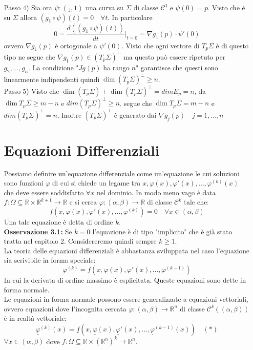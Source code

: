 \documentclass[a4paper,11pt,titlepage]{book}
\begin{document}
Passo 4) Sia ora $\psi:(_1,1)$ una curva su $\Sigma$ di classe $\mathcal{C}^1$ e $\psi(0)=p$. Visto che è su $\Sigma$ allora $(g_1\circ\psi)(t)=0\quad\forall t$. In particolare $$0=\frac{d((g_1\circ\psi)(t))}{dt}|_{t=0}=\nabla g_1(p)\cdot\psi'(0)$$ ovvero $\nabla g_1(p)$ è ortogonale a $\psi ' (0)$. Visto che ogni vettore di $T_p\Sigma$ è di questo tipo ne segue che $\nabla g_1(p)\in (T_p\Sigma)^\perp$ ma questo può essere ripetuto per $g_2,\ldots,g_n$. La condizione "$Jg(p)$ ha rango $n$" garantisce che questi sono linearmente indipendenti quindi $\dim(T_p\Sigma)^\perp\geq n$.\\

Passo 5) Visto che $\dim(T_p\Sigma)+\dim(T_p\Sigma)^\perp=dim E_p=n$, da $\dim T_p\Sigma\geq m-n$ e $dim(T_p\Sigma)^\perp\geq n$, segue che $\dim T_p\Sigma= m-n$ e $dim(T_p\Sigma)^\perp = n$. Inoltre $(T_p\Sigma)^\perp$ è generato dai $\nabla g_j(p)\quad j=1,\ldots,n$

\chapter{Equazioni Differenziali}

Possiamo definire un'equazione differenziale come un'equazione le cui soluzioni sono funzioni $\varphi$ di cui si chiede un legame tra $x,\varphi(x),\varphi'(x),\ldots,\varphi^{(k)}(x)$ che deve essere soddisfatto $\forall x$ nel dominio. In modo meno vago è data $f:\Omega\subseteq\mathbb{R}\times\mathbb{R}^{k+1}\to\mathbb{R}$ e si cerca $\varphi:(\alpha,\beta)\to\mathbb{R}$ di classe $\mathcal{C}^k$ tale che: $$f(x,\varphi(x),\varphi'(x),\ldots,\varphi^{(k)})=0\quad\forall x \in (\alpha,\beta)$$ Una tale equazione è detta di ordine $k$.\\

\textbf{Osservazione 3.1:} Se $k=0$ l'equazione è di tipo "implicito" che è già stato tratta nel capitolo 2. Considereremo quindi sempre $k\geq 1$.\\

La teoria delle equazioni differenziali è abbastanza sviluppata nel caso l'equazione sia scrivibile in forma speciale: $$\varphi^{(k)}=f(x,\varphi(x),\varphi'(x),\ldots,\varphi^{(k-1)})$$ In cui la derivata di ordine massimo è esplicitata. Queste equazioni sono dette in forma normale.\\

Le equazioni in forma normale possono essere generalizzate a equazioni vettoriali, ovvero equazioni dove l'incognita cercata $\varphi:(\alpha ,\beta)\to\mathbb{R}^n$ di classe $\mathcal{C}^k((\alpha,\beta))$ è in realtà vettoriale: $$\underline{\varphi}^{(k)}(x)=\underline{f}(x,\underline{\varphi}(x),\underline{\varphi}'(x),\ldots,\underline{\varphi}^{(k-1)}(x)) \quad (*)$$
$\forall x\in(\alpha,\beta)$ dove $f:\Omega\subseteq\mathbb{R}\times (\mathbb{R}^n)^k\to\mathbb{R}^n$.\\
\end{document}
